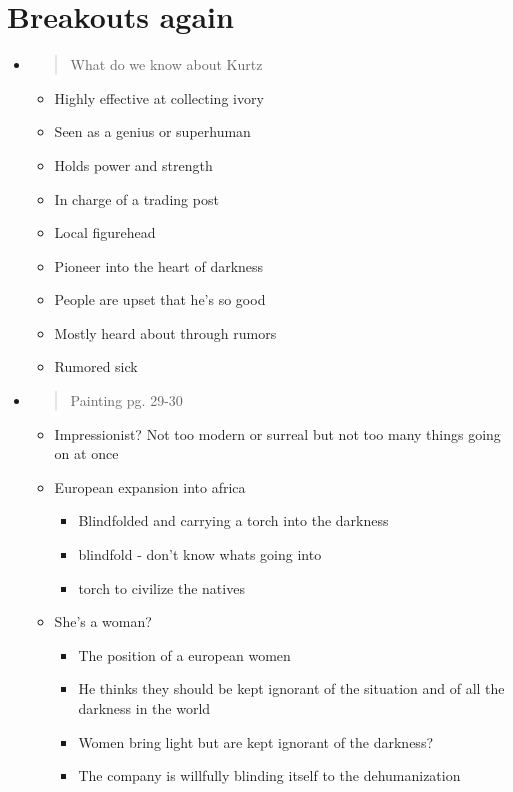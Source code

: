 \documentclass[letterpaper]{article}
\begin{document}
\section{Breakouts again}
\label{sec:orgf3f0524}
\begin{itemize}
\item \begin{quote}
What do we know about Kurtz
\end{quote}

\begin{itemize}
\item Highly effective at collecting ivory
\item Seen as a genius or superhuman
\item Holds power and strength
\item In charge of a trading post
\item Local figurehead
\item Pioneer into the heart of darkness
\item People are upset that he's so good
\item Mostly heard about through rumors
\item Rumored sick
\end{itemize}

\item \begin{quote}
Painting pg. 29-30
\end{quote}

\begin{itemize}
\item Impressionist? Not too modern or surreal but not too many things
going on at once
\item European expansion into africa

\begin{itemize}
\item Blindfolded and carrying a torch into the darkness
\item blindfold - don't know whats going into
\item torch to civilize the natives
\end{itemize}

\item She's a woman?

\begin{itemize}
\item The position of a european women
\item He thinks they should be kept ignorant of the situation and of all
the darkness in the world
\item Women bring light but are kept ignorant of the darkness?
\item The company is willfully blinding itself to the dehumanization
\end{itemize}


\end{itemize}
\end{itemize}
\end{document}
